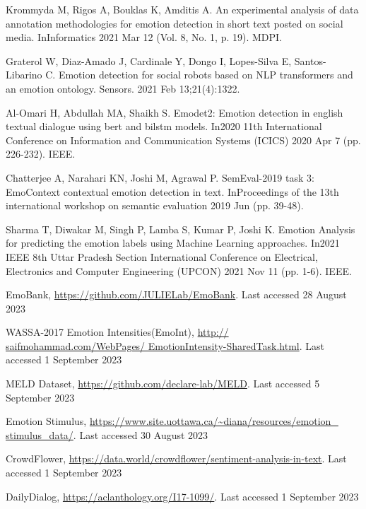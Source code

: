 \documentclass[runningheads]{llncs}
\begin{document}
\begin{thebibliography}{8}
Krommyda M, Rigos A, Bouklas K, Amditis A. An experimental analysis of data annotation methodologies for emotion detection in short text posted on social media. InInformatics 2021 Mar 12 (Vol. 8, No. 1, p. 19). MDPI.

Graterol W, Diaz-Amado J, Cardinale Y, Dongo I, Lopes-Silva E, Santos-Libarino C. Emotion detection for social robots based on NLP transformers and an emotion ontology. Sensors. 2021 Feb 13;21(4):1322.

Al-Omari H, Abdullah MA, Shaikh S. Emodet2: Emotion detection in english textual dialogue using bert and bilstm models. In2020 11th International Conference on Information and Communication Systems (ICICS) 2020 Apr 7 (pp. 226-232). IEEE.

Chatterjee A, Narahari KN, Joshi M, Agrawal P. SemEval-2019 task 3: EmoContext contextual emotion detection in text. InProceedings of the 13th international workshop on semantic evaluation 2019 Jun (pp. 39-48).

Sharma T, Diwakar M, Singh P, Lamba S, Kumar P, Joshi K. Emotion Analysis for predicting the emotion labels using Machine Learning approaches. In2021 IEEE 8th Uttar Pradesh Section International Conference on Electrical, Electronics and Computer Engineering (UPCON) 2021 Nov 11 (pp. 1-6). IEEE.





EmoBank, \url{https://github.com/JULIELab/EmoBank}. Last accessed 28 August 2023

WASSA-2017 Emotion Intensities(EmoInt), \url{http://
saifmohammad.com/WebPages/
EmotionIntensity-SharedTask.html}.
Last accessed 1 September 2023

MELD Dataset, \url{https://github.com/declare-lab/MELD}. Last accessed 5 September 2023

Emotion Stimulus, \url{https://www.site.uottawa.ca/\~diana/resources/emotion\_
stimulus\_data/}. Last accessed 30 August 2023

CrowdFlower, \url{https://data.world/crowdflower/sentiment-analysis-in-text}.
Last accessed 1 September 2023

DailyDialog, \url{https://aclanthology.org/I17-1099/}. Last accessed 1 September 2023


\end{thebibliography}
\end{document}
